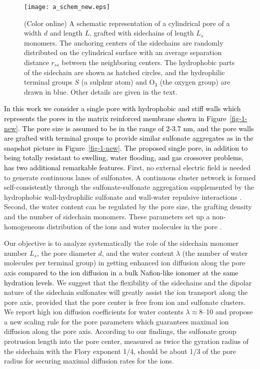 \documentclass[3p,english,preprint]{elsarticle}
\newcommand{\need}[1]{\textcolor{black}{#1}}
\newcommand{\mage}[1]{\textcolor{black}{#1}}
\begin{document}
\begin{figure} [!ht]
\begin{center}
\texttt{[image: a\_schem\_new.eps]}
\end{center}
\vspace{-0.5cm} 
 \caption{ 
(Color online) A schematic representation of a cylindrical  pore 
of a width  $d$ and length $L$, grafted with sidechains
 of length $L_s$ monomers. 
 The anchoring centers of the  sidechains are randomly distributed 
 on the cylindrical surface with an average separation distance $r_{ss}$ 
between the neighboring centers. The hydrophobic parts 
of the sidechain are shown as hatched circles, and 
the hydrophilic terminal groups $S$ (a sulphur atom) 
and O$_3$ (the oxygen group) are drawn in blue. Other details 
are given in the text. 
\label{fig-2-new}
}
\end{figure}


{\need{ 
In this work we consider a single pore with hydrophobic and stiff walls
 which represents the pores in the matrix reinforced membrane 
shown in Figure~\ref{fig-1-new}. 
The pore size is assumed to be in the range of 2-3.7 nm, 
and the pore walls are grafted with terminal groups to provide  similar 
sulfonate aggregates  as in the snapshot picture in  Figure~\ref{fig-1-new}. 
The proposed single pore, in addition to being totally resistant to swelling, 
water flooding, and gas crossover problems, has two additional  remarkable features.
}}
 First,  no external electric field is needed to generate continuous lanes of sulfonates.
A continuous cluster  network  is formed self-consistently through  the sulfonate-sulfonate aggregation   
 supplemented  by the hydrophobic wall-hydrophilic sulfonate and 
wall-water repulsive interactions  \cite{allahyarov-2015,kumar-2005}.
 Second, the water content can be regulated by the pore size, the grafting density and 
 the number of sidechain monomers. These parameters set up a non-homogeneous distribution of the ions 
and water molecules in the pore  \cite{allahyarov-2015,sulbaran-2005,jonsson-1990}. 

Our objective is to analyze systematically  the role of the sidechain monomer number
 $L_s$, the pore diameter $d$, and the water content $\lambda$ (the number of water molecules per terminal group)
 in getting enhanced ion diffusion along the pore axis 
{\need{
compared to the ion diffusion in a bulk Nafion-like ionomer at the same hydration levels.
}} 
We suggest that the flexibility of the sidechains  and the dipolar nature 
of the sidechain sulfonates will greatly assist the ion transport along the pore 
axis, provided that the pore center is free from ion and sulfonate clusters. 
We report high ion diffusion coefficients  for water contents  
$\lambda$$\approx$8--10 and propose a  new scaling rule for the pore 
parameters which guarantees maximal ion diffusion along the pore axis. 
 According to our findings, the sulfonate group protrusion length into the pore center,
 measured as twice the gyration radius of the sidechain with the Flory exponent 1/4, 
should be about 1/3 of the pore radius for securing maximal diffusion rates for the ions. 
\end{document}
